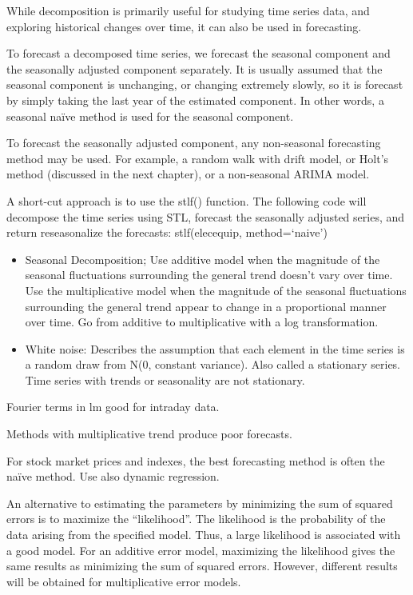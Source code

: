 \documentclass[]{book}
\begin{document}
While decomposition is primarily useful for studying time series data, and exploring historical changes over time, it can also be used in forecasting.

To forecast a decomposed time series, we forecast the seasonal component and the seasonally adjusted component separately. It is usually assumed that the seasonal component is unchanging, or changing extremely slowly, so it is forecast by simply taking the last year of the estimated component. In other words, a seasonal naïve method is used for the seasonal component.

To forecast the seasonally adjusted component, any non-seasonal forecasting method may be used. For example, a random walk with drift model, or Holt's method (discussed in the next chapter), or a non-seasonal ARIMA model.

A short-cut approach is to use the stlf() function. The following code will decompose the time series using STL, forecast the seasonally adjusted series, and return reseasonalize the forecasts: stlf(elecequip, method=`naive')

\begin{itemize}
\item
  Seasonal Decomposition; Use additive model when the magnitude of the seasonal fluctuations surrounding the general trend doesn't vary over time. Use the multiplicative model when the magnitude of the seasonal fluctuations surrounding the general trend appear to change in a proportional manner over time. Go from additive to multiplicative with a log transformation.
\item
  White noise: Describes the assumption that each element in the time series is a random draw from N(0, constant variance). Also called a stationary series. Time series with trends or seasonality are not stationary.
\end{itemize}

Fourier terms in lm good for intraday data.

Methods with multiplicative trend produce poor forecasts.

For stock market prices and indexes, the best forecasting method is often the naïve method. Use also dynamic regression.

An alternative to estimating the parameters by minimizing the sum of squared errors is to maximize the ``likelihood''. The likelihood is the probability of the data arising from the specified model. Thus, a large likelihood is associated with a good model. For an additive error model, maximizing the likelihood gives the same results as minimizing the sum of squared errors. However, different results will be obtained for multiplicative error models.
\end{document}
